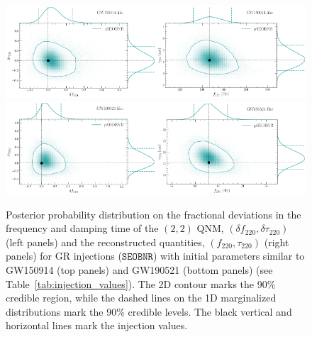 \documentclass[twocolumn,prd,aps,superscriptaddress,preprintnumbers,tightenlines,showpacs,nofootinbib,eqsecnum,amsfonts,amsmath]{revtex4-1}
\newcommand{\df}[1]{\delta f_{\text{#1}}}
\newcommand{\dtau}[1]{\delta \tau_{\text{#1}}}
\newcommand{\fngr}[1]{f_{\text{#1}}}
\newcommand{\taungr}[1]{\tau_{\text{#1}}}
\newcommand{\SEOB}{\texttt{SEOBNR}}
\begin{document}
\begin{figure}[hbt]
\begin{center}
        \includegraphics[width=0.5\textwidth]{figures/GW150914_simulated_signal_0p0_deltaf220_deltatau220.png}\includegraphics[width=0.5\textwidth]{figures/GW150914_simulated_signal_0p0_f220_tau220.png}
        \includegraphics[width=0.5\textwidth]{figures/GW190521_simulated_signal_0p0_deltaf220_deltatau220.png}\includegraphics[width=0.5\textwidth]{figures/GW190521_simulated_signal_0p0_f220_tau220.png}
        \caption{Posterior probability
          distribution on the fractional deviations in the frequency
          and damping time of the $(2,2)$ QNM, $(\df{220},\dtau{220})$
          (left panels) and the reconstructed quantities,
          $(\fngr{220}, \taungr{220})$ (right panels) for GR
          injections ($\SEOB$) with initial parameters similar to GW150914 (top
          panels) and GW190521 (bottom panels)
          (see Table~\ref{tab:injection_values}). The 2D contour marks the
          90\% credible region, while the dashed lines on the 1D
          marginalized distributions mark the 90\% credible
          levels. The black vertical and horizontal lines mark the
          injection values.}
        \label{fig:simulated_signal_GR}
\end{center}
\end{figure}
\end{document}
